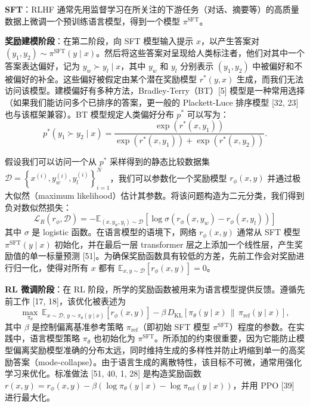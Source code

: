 \documentclass[11pt,UTF8,fontset=fandol]{ctexart}
\newcommand{\KL}{\mathrm{KL}}
\newcommand{\sref}{\mathrm{ref}}
\newcommand{\ssft}{\mathrm{SFT}}
\begin{document}
\textbf{SFT}：RLHF 通常先用监督学习在所关注的下游任务（对话、摘要等）的高质量数据上微调一个预训练语言模型，得到一个模型 $\pi^{\ssft}$。

\textbf{奖励建模阶段}：在第二阶段，向 SFT 模型输入提示 $x$，以产生答案对 $(y_1, y_2) \sim \pi^{\ssft}(y \mid x)$。然后将这些答案对呈现给人类标注者，他们对其中一个答案表达偏好，记为 $y_w \succ y_l \mid x$，其中 $y_w$ 和 $y_l$ 分别表示 $(y_1, y_2)$ 中被偏好和不被偏好的补全。这些偏好被假定由某个潜在奖励模型 $r^*(y, x)$ 生成，而我们无法访问该模型。建模偏好有多种方法，Bradley-Terry（BT）[5] 模型是一种常用选择（如果我们能访问多个已排序的答案，更一般的 Plackett-Luce 排序模型 [32, 23] 也与该框架兼容）。BT 模型规定人类偏好分布 $p^*$ 可以写为：
\begin{equation}
p^*(y_1 \succ y_2 \mid x) = \frac{\exp\left(r^*(x, y_1)\right)}{\exp\left(r^*(x, y_1)\right) + \exp\left(r^*(x, y_2)\right)}. \tag{1}
\end{equation}

假设我们可以访问一个从 $p^*$ 采样得到的静态比较数据集 $\mathcal{D} = \left\{x^{(i)}, y_w^{(i)}, y_l^{(i)}\right\}_{i=1}^N$，我们可以参数化一个奖励模型 $r_\phi(x, y)$ 并通过极大似然（maximum likelihood）估计其参数。将该问题构造为二元分类，我们得到负对数似然损失：
\begin{equation}
\mathcal{L}_R(r_\phi, \mathcal{D}) = -\mathbb{E}_{(x, y_w, y_l) \sim \mathcal{D}}\left[\log \sigma\left(r_\phi(x, y_w) - r_\phi(x, y_l)\right)\right] \tag{2}
\end{equation}
其中 $\sigma$ 是 logistic 函数。在语言模型的语境下，网络 $r_\phi(x, y)$ 通常从 SFT 模型 $\pi^{\ssft}(y \mid x)$ 初始化，并在最后一层 transformer 层之上添加一个线性层，产生奖励值的单一标量预测 [51]。为确保奖励函数具有较低的方差，先前工作会对奖励进行归一化，使得对所有 $x$ 都有 $\mathbb{E}_{x, y \sim \mathcal{D}}[r_\phi(x, y)] = 0$。

\textbf{RL 微调阶段}：在 RL 阶段，所学的奖励函数被用来为语言模型提供反馈。遵循先前工作 [17, 18]，该优化被表述为
\begin{equation}
\max_{\pi_\theta}\ \mathbb{E}_{x \sim \mathcal{D},\, y \sim \pi_\theta(y \mid x)}\left[r_\phi(x, y)\right] - \beta\, D_{\KL}\left[\pi_\theta(y \mid x) \,\|\, \pi_\sref(y \mid x)\right], \tag{3}
\end{equation}
其中 $\beta$ 是控制偏离基准参考策略 $\pi_\sref$（即初始 SFT 模型 $\pi^{\ssft}$）程度的参数。在实践中，语言模型策略 $\pi_\theta$ 也初始化为 $\pi^{\ssft}$。所添加的约束很重要，因为它能防止模型偏离奖励模型准确的分布太远，同时维持生成的多样性并防止坍缩到单一的高奖励答案（mode-collapse）。由于语言生成的离散特性，该目标不可微，通常用强化学习来优化。标准做法 [51, 40, 1, 28] 是构造奖励函数 $r(x, y) = r_\phi(x, y) - \beta\left(\log \pi_\theta(y \mid x) - \log \pi_\sref(y \mid x)\right)$，并用 PPO [39] 进行最大化。
\end{document}
